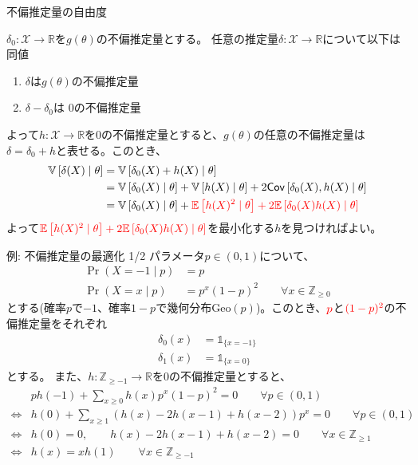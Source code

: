 \documentclass[lualatex,handout]{beamer}
\newcommand{\mycolor}[2]{%
  \begingroup
  \colorlet{currentcolor}{.}%
  \color{#1}#2%
  \color{currentcolor}%
  \endgroup
}
\newcommand{\emm}[1]{\mycolor{red}{#1}}
\newcommand{\expt}[1]{\mathbb{E}\left[#1\right]}
\newcommand{\var}[1]{\mathbb{V}\left[#1\right]}
\newcommand{\cov}[1]{\mathsf{Cov}\left[#1\right]}
\theoremstyle{definition}
\begin{document}
\begin{frame}{不偏推定量の自由度}
\begin{fact}
$\delta_0\colon\mathcal{X}\to\mathbb{R}$を$g(\theta)$の不偏推定量とする。
任意の推定量$\delta\colon\mathcal{X}\to\mathbb{R}$について以下は同値
\begin{enumerate}
\item $\delta$は$g(\theta)$の不偏推定量
\item $\delta-\delta_0$は $0$の不偏推定量
\end{enumerate}
\end{fact}
よって$h\colon\mathcal{X}\to\mathbb{R}$を$0$の不偏推定量とすると、$g(\theta)$の任意の不偏推定量は$\delta=\delta_0+h$と表せる。このとき、
\begin{align*}
\var{\delta(X)\mid\theta}&=
\var{\delta_0(X)+h(X)\mid\theta}\\
&= \var{\delta_0(X)\mid\theta}+\var{h(X)\mid\theta}+2\cov{\delta_0(X), h(X)\mid\theta}\\
&= \var{\delta_0(X)\mid\theta}+\emm{\expt{h(X)^2\mid\theta}+2\expt{\delta_0(X)h(X)\mid\theta}}
\end{align*}
よって$\emm{\expt{h(X)^2\mid\theta}+2\expt{\delta_0(X)h(X)\mid\theta}}$を最小化する$h$を見つければよい。
\end{frame}

\begin{frame}{例: 不偏推定量の最適化 1/2}
\small
パラメータ$p\in(0,1)$について、
\begin{align*}
\Pr(X=-1\mid p) &= p\\
\Pr(X=x\mid p) &= p^x (1-p)^2 \qquad\forall x\in\mathbb{Z}_{\ge 0}
\end{align*}
とする(確率$p$で$-1$、確率$1-p$で幾何分布$\mathrm{Geo}(p)$)。このとき、$\emm{p}$と$\emm{(1-p)^2}$の不偏推定量をそれぞれ
\begin{align*}
\delta_0(x) &=\mathbb{1}_{\{x = -1\}}\\
\delta_1(x) &=\mathbb{1}_{\{x = 0\}}
\end{align*}
とする。
また、$h\colon\mathbb{Z}_{\ge -1}\to\mathbb{R}$を$0$の不偏推定量とすると、
\begin{align*}
&ph(-1) + \sum_{x\ge 0} h(x) p^x (1-p)^2 = 0\qquad\forall p\in(0,1)\\
\iff&h(0) + \sum_{x\ge 1} (h(x)-2h(x-1)+h(x-2)) p^x = 0\qquad\forall p\in(0,1)\\
\iff&h(0)=0,\qquad h(x)-2h(x-1)+h(x-2) = 0\qquad\forall x\in\mathbb{Z}_{\ge1}\\
\iff&h(x)=xh(1)\qquad\forall x\in\mathbb{Z}_{\ge-1}\\
\end{align*}
\end{frame}
\end{document}
